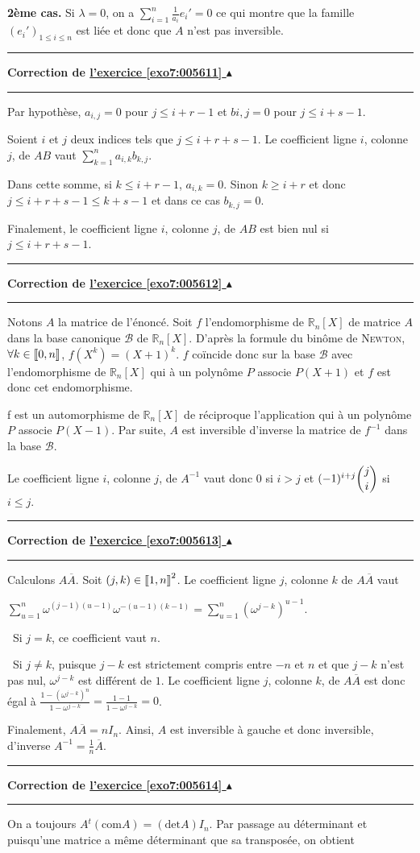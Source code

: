 \documentclass[11pt,a4paper]{article}
\newcommand{\Rr}{\mathbb{R}} \newcommand{\R}{\mathbb{R}}
\newcommand{\llbracket}{\left[\kern-0.15em\left[}
\newcommand{\rrbracket}{\right]\kern-0.15em\right]}
\newcounter{exo}
\newcommand{\correction}[1]{\hypertarget{cor7:#1}{}\label{cor7:#1}{\bf Correction de \hyperlink{exo7:#1}{l'exercice \ref{exo7:#1} $\blacktriangle$}}\vspace{1mm}\hrule\vspace{1mm}}
\newcommand{\fincorrection}{\vspace{1mm}\hrule\vspace*{7mm}}
\begin{document}
\textbf{2ème cas.} Si $\lambda=0$, on a $\sum_{i=1}^{n}\frac{1}{a_i}e_i'=0$ ce qui montre que la famille $(e_i')_{1\leqslant i\leqslant n}$ est liée et donc que $A$ n'est pas inversible.
\fincorrection
\correction{005611}
Par hypothèse, $a_{i,j}= 0$ pour $j\leqslant i + r - 1$ et $bi,j = 0$ pour $j\leqslant i + s - 1$.

Soient $i$ et $j$ deux indices tels que $j\leqslant i + r + s - 1$. Le coefficient ligne $i$, colonne $j$, de $AB$ vaut $\sum_{k=1}^{n}a_{i,k}b_{k,j}$.

 
Dans cette somme, si $k\leqslant i + r -1$, $a_{i,k}= 0$. Sinon $k\geqslant i + r$ et donc $j\leqslant i + r + s - 1\leqslant k + s - 1$ et dans ce cas $b_{k,j}= 0$.

Finalement, le coefficient ligne $i$, colonne $j$, de $AB$ est bien nul si $j\leqslant i + r+s-1$.
\fincorrection
\correction{005612}
Notons $A$ la matrice de l'énoncé. Soit $f$ l'endomorphisme de $\Rr_n[X]$ de matrice $A$ dans la base canonique $\mathcal{B}$ de $\Rr_n[X]$. D'après la formule du binôme de \textsc{Newton}, $\forall k\in\llbracket0,n\rrbracket$, $f(X^k)=(X+1)^k$. $f$ coïncide donc sur la base $\mathcal{B}$ avec l'endomorphisme de $\Rr_n[X]$ qui à un polynôme $P$ associe $P(X+1)$ et $f$ est donc cet endomorphisme.

f est un automorphisme de $\Rr_n[X]$ de réciproque  l'application qui à un polynôme $P$ associe $P(X-1)$. Par suite, $A$ est inversible d'inverse la matrice de $f^{-1}$ dans la base $\mathcal{B}$.

Le coefficient ligne $i$, colonne $j$, de $A^{-1}$ vaut donc $0$ si $i > j$ et $(-1)^{i+j}\dbinom{j}{i}$ si $i\leqslant j$.
\fincorrection
\correction{005613}
Calculons $A\overline{A}$. Soit $(j,k)\in\llbracket1,n\rrbracket^2$. Le coefficient ligne $j$, colonne $k$ de $A\overline{A}$ vaut

\begin{center}
$\sum_{u=1}^{n}\omega^{(j-1)(u-1)}\omega^{-(u-1)(k-1)}=\sum_{u=1}^{n}\left(\omega^{j-k}\right)^{u-1}$.
\end{center}

\textbullet~Si $j=k$, ce coefficient vaut $n$.

\textbullet~Si $j\neq k$, puisque $j-k$ est strictement compris entre $-n$ et $n$ et que $j-k$ n'est pas nul, $\omega^{j-k}$ est différent de $1$. Le coefficient ligne $j$, colonne $k$, de $A\overline{A}$ est donc égal à $\frac{1-\left(\omega^{j-k}\right)^{n}}{1-\omega^{j-k}}=\frac{1-1}{1-\omega^{j-k}}= 0$.

Finalement, $A\overline{A}=nI_n$. Ainsi, $A$ est inversible à gauche et donc inversible, d'inverse $A^{-1}=\frac{1}{n}\overline{A}$.
\fincorrection
\correction{005614}
On a toujours $A{^t}(\text{com}A)=(\text{det}A)I_n$. Par passage au déterminant et puisqu'une matrice a même déterminant que sa transposée, on obtient
\end{document}
